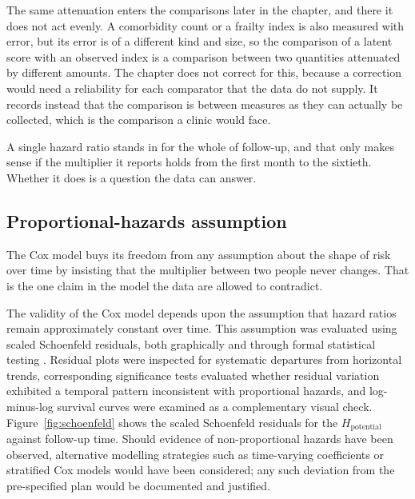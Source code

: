 The same attenuation enters the comparisons later in the chapter, and there it does not act evenly. A comorbidity count or a frailty index is also measured with error, but its error is of a different kind and size, so the comparison of a latent score with an observed index is a comparison between two quantities attenuated by different amounts. The chapter does not correct for this, because a correction would need a reliability for each comparator that the data do not supply. It records instead that the comparison is between measures as they can actually be collected, which is the comparison a clinic would face.

\medskip
{}

A single hazard ratio stands in for the whole of follow-up, and that only makes sense if the multiplier it reports holds from the first month to the sixtieth. Whether it does is a question the data can answer.

\subsection{Proportional-hazards assumption}
\label{sec:prog-ph}

\noindent The Cox model buys its freedom from any assumption about the shape of risk over time by insisting that the multiplier between two people never changes. That is the one claim in the model the data are allowed to contradict.

The validity of the Cox model depends upon the assumption that hazard ratios remain approximately constant over time. This assumption was evaluated using scaled Schoenfeld residuals, both graphically and through formal statistical testing \citep{grambsch_1994}. Residual plots were inspected for systematic departures from horizontal trends, corresponding significance tests evaluated whether residual variation exhibited a temporal pattern inconsistent with proportional hazards, and log-minus-log survival curves were examined as a complementary visual check. Figure~\ref{fig:schoenfeld} shows the scaled Schoenfeld residuals for the $H_{\text{potential}}$ against follow-up time. Should evidence of non-proportional hazards have been observed, alternative modelling strategies such as time-varying coefficients or stratified Cox models would have been considered; any such deviation from the pre-specified plan would be documented and justified.


